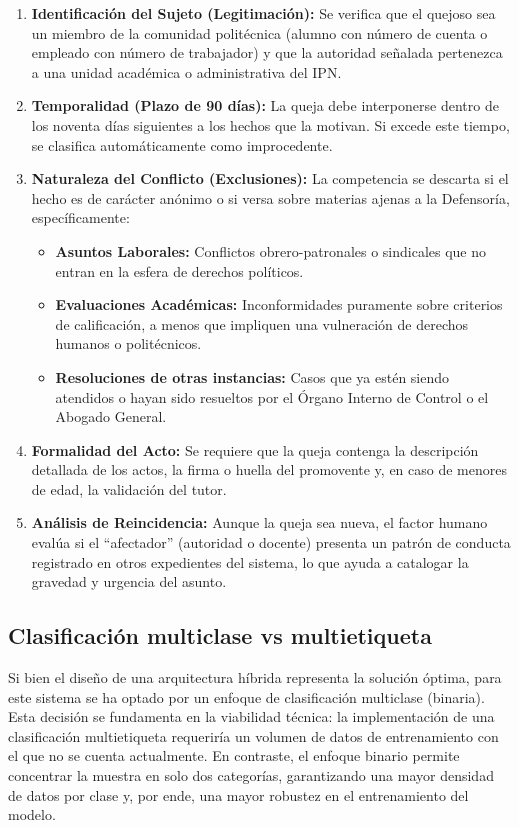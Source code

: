 \begin{enumerate}
\item \textbf{Identificación del Sujeto (Legitimación):} Se verifica que el quejoso sea un miembro de la comunidad politécnica (alumno con número de cuenta o empleado con número de trabajador) y que la autoridad señalada pertenezca a una unidad académica o administrativa del IPN.
\item \textbf{Temporalidad (Plazo de 90 días):} La queja debe interponerse dentro de los noventa días siguientes a los hechos que la motivan. Si excede este tiempo, se clasifica automáticamente como improcedente.
\item \textbf{Naturaleza del Conflicto (Exclusiones):} La competencia se descarta si el hecho es de carácter anónimo o si versa sobre materias ajenas a la Defensoría, específicamente:
\begin{itemize}
\item[3.1.] \textbf{Asuntos Laborales:} Conflictos obrero-patronales o sindicales que no entran en la esfera de derechos políticos.
\item[3.2.] \textbf{Evaluaciones Académicas:} Inconformidades puramente sobre criterios de calificación, a menos que impliquen una vulneración de derechos humanos o politécnicos.
\item[3.3.] \textbf{Resoluciones de otras instancias:} Casos que ya estén siendo atendidos o hayan sido resueltos por el Órgano Interno de Control o el Abogado General.
\end{itemize}
\item \textbf{Formalidad del Acto:} Se requiere que la queja contenga la descripción detallada de los actos, la firma o huella del promovente y, en caso de menores de edad, la validación del tutor.
\item \textbf{Análisis de Reincidencia:} Aunque la queja sea nueva, el factor humano evalúa si el “afectador” (autoridad o docente) presenta un patrón de conducta registrado en otros expedientes del sistema, lo que ayuda a catalogar la gravedad y urgencia del asunto.
\end{enumerate}

\subsection{Clasificación multiclase vs multietiqueta}

Si bien el diseño de una arquitectura híbrida representa la solución óptima, para este sistema se ha optado por un enfoque de clasificación multiclase (binaria). Esta decisión se fundamenta en la viabilidad técnica: la implementación de una clasificación multietiqueta requeriría un volumen de datos de entrenamiento con el que no se cuenta actualmente. En contraste, el enfoque binario permite concentrar la muestra en solo dos categorías, garantizando una mayor densidad de datos por clase y, por ende, una mayor robustez en el entrenamiento del modelo.

